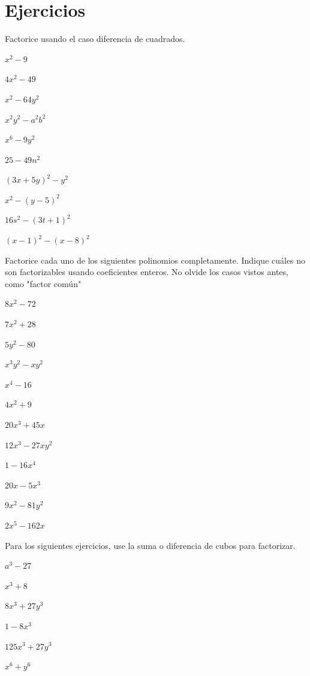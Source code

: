 \documentclass[10pt,twoside]{article}
\begin{document}
\section*{Ejercicios}
Factorice usando el caso diferencia de cuadrados.
\begin{enumerate}
\begin{multicols}{2}
\item $x^{2}-9$
\item $4x^{2}-49$
\item $x^{2}-64y^{2}$
\item $x^{2}y^{2}-a^{2}b^{2}$
\item $x^{6}-9y^{2}$
\item $25-49n^{2}$
\item $(3x+5y)^{2}-y^{2}$
\item $x^{2}-(y-5)^{2}$
\item $16s^{2}-(3t+1)^{2}$
\item $(x-1)^{2}-(x-8)^{2}$
\end{multicols}
Factorice cada uno de los siguientes polinomios completamente. Indique cuáles no son factorizables usando coeficientes enteros. No olvide los casos vistos antes, como "factor común"
\begin{multicols}{2}
\item $8x^{2}-72$
\item $7x^{2}+28$
\item $5y^{2}-80$
\item $x^{3}y^{2}-xy^{2}$
\item $x^{4}-16$
\item $4x^{2}+9$
\item $20x^{3}+45x$
\item $12x^{3}-27xy^{2}$
\item $1-16x^{4}$
\item $20x-5x^{3}$
\item $9x^{2}-81y^{2}$
\item $2x^{5}-162x$
\end{multicols}
Para los siguientes ejercicios, use la suma o diferencia de cubos para factorizar.
\begin{multicols}{2}
\item $a^{3}-27$
\item $x^{3}+8$
\item $8x^{3}+27y^{3}$
\item $1-8x^{3}$
\item $125x^{3}+27y^{3}$
\item $x^{6}+y^{6}$
\end{multicols}

\end{enumerate}
\end{document}
